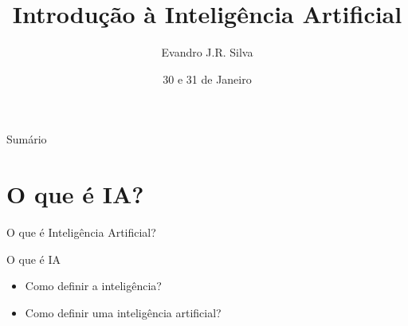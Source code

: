 \documentclass{libs/ufc_format}
\title[Introdução a IA]{\huge\textbf{Introdução à Inteligência Artificial}}
\author{Evandro J.R. Silva}
\institute[Estácio Teresina]{
    \normalsize{\email{ejrs.profissional@gmail.com}}
    \newline
    \newline
    \estaciothe
}
\date{30 e 31 de Janeiro}
\begin{document}


\begin{frame}{}
    \maketitle
\end{frame}

\begin{frame}{Sumário}
    \begin{multicols}{2}
        \tableofcontents
    \end{multicols}
\end{frame}

\section{O que é IA?}

\begin{frame}{}
    \centering
    \Large
    O que é Inteligência Artificial?
\end{frame}

\begin{frame}{O que é IA}
    \begin{itemize}
        \justifying
        \item Como definir a inteligência?
        \item<2-> Como definir uma inteligência artificial?\\
    \end{itemize}
\end{frame}
\end{document}
